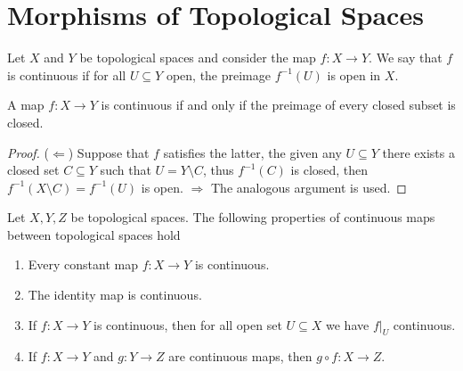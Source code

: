 \section{Morphisms of Topological Spaces}

\begin{definition}\label{def: continuous map}
  Let \(X\) and \(Y\) be topological spaces and consider the map \(f : X \to
  Y\). We say that \(f\) is continuous if for all \(U \subseteq Y\) open, the
  preimage \(f^{-1}(U)\) is open in \(X\).
\end{definition}

\begin{proposition}
  A map \(f : X \to Y\) is continuous if and only if the preimage of every
  closed subset is closed.
\end{proposition}

\begin{proof}
  (\(\Leftarrow\)) Suppose that \(f\) satisfies the latter, the given any \(U
  \subseteq Y\) there exists a closed set \(C \subseteq Y\) such that \(U = Y
  \setminus C\), thus \(f^{-1}(C)\) is closed, then \(f^{-1}(X \setminus C) =
  f^{-1}(U)\) is open. \(\Rightarrow\) The analogous argument is used.
\end{proof}

\begin{proposition}\label{prop: continuous maps properties}
  Let \(X, Y, Z\) be topological spaces. The following properties of continuous
  maps between topological spaces hold
  \begin{enumerate}[(CM1)]
    \item Every constant map \(f: X \to Y\) is continuous.
    \item The identity map is continuous.
    \item If \(f: X \to Y\) is continuous, then for all open set \(U \subseteq
      X\) we have \(f|_U\) continuous.
    \item If \(f: X \to Y\) and \(g: Y \to Z\) are continuous maps, then \(g
      \circ f : X \to Z\).
  \end{enumerate}
\end{proposition}


